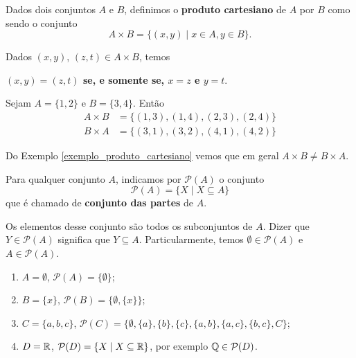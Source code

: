 \begin{definicao}
	Dados dois conjuntos $A$ e $B$, definimos o \textbf{produto cartesiano} de $A$ por $B$ como sendo o conjunto
	\[
		A \times B = \{(x,y) \mid x\in A, y\in B\}.
	\]
\end{definicao}

Dados $(x,y)$, $(z,t) \in A\times B$, temos
\begin{center}
	\textbf{$(x,y) = (z,t)$ se, e somente se, $x = z$ e $y = t$}.
\end{center}

\begin{exemplo}\label{exemplo_produto_cartesiano}
	Sejam $A = \{1,2\}$ e $B = \{3,4\}$. Então
	\begin{align*}
		A \times B &= \{(1,3), (1,4), (2,3), (2,4)\}\\
		B \times A &= \{(3,1), (3,2), (4,1), (4,2)\}
\end{align*}
\end{exemplo}

\begin{observacao}
	Do Exemplo \eqref{exemplo_produto_cartesiano} vemos que em geral $A \times B \neq B\times A$.
\end{observacao}

\begin{definicao}
	Para qualquer conjunto $A$, indicamos por $\mathcal{P}(A)$ o conjunto
	\[
		\mathcal{P}(A) = \{ X \mid X\subseteq A\}
	\]
	que \'e chamado de \textbf{conjunto das partes} de $A$.
\end{definicao}

Os elementos desse conjunto s{\~a}o todos os subconjuntos de $A$. Dizer que $Y\in \mathcal{P}(A)$ significa que $Y \subseteq A$. Particularmente, temos $\emptyset\in \mathcal{P}(A)$ e $A\in \mathcal{P}(A)$.

\begin{exemplos}
	\begin{enumerate}
		\item $A = \emptyset$, $\mathcal{P}(A) = \{\emptyset\}$;
		\item $B = \{x\}$, $\mathcal{P}(B) = \{\emptyset, \{x\}\}$;
		\item $C = \{a,b,c\}$, $\mathcal{P}(C)=\{\emptyset, \{a\}, \{b\},\{c\},\{a,b\},\{a,c\},\{b,c\},C\}$;
		\item $D=\mathbb{R}$, $\mathcal{P}(D)=\{X\mid X \subseteq \mathbb{R}\}$, por exemplo $\mathbb{Q}\in \mathcal{P}(D)$.
	\end{enumerate}	
\end{exemplos}